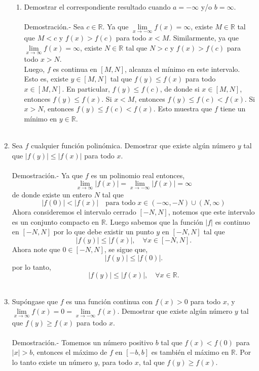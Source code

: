 \begin{enumerate}[\bfseries 1.]
\begin{enumerate}[\bfseries (a)]
	\item Demostrar el correspondiente resultado cuando $a=-\infty$ y/o $b=\infty$.\\\\
	    Demostración.-\; Sea $c\in \mathbb{R}$. Ya que $\lim\limits_{x\to -\infty}f(x) = \infty$, existe $M\in \mathbb{R}$ tal que $M<c$ y $f(x)>f(c)$ para todo $x<M.$ Similarmente, ya que $\lim\limits_{x\to \infty} f(x)=\infty$, existe $N\in \mathbb{R}$ tal que $N>c$ y $f(x)>f(c)$ para todo $x>N$.\\
	    Luego, $f$ es continua en $[M,N]$, alcanza el mínimo en este intervalo. Esto es, existe $y\in [M,N]$ tal que $f(y)\leq f(x)$ para todo $x\in [M,N]$. En particular, $f(y)\leq f(c)$, de donde si $x\in [M,N]$, entonces $f(y)\leq f(x).$ Si $x<M$, entonces $f(y)\leq f(c)<f(x).$ Si $x>N$, entonces $f(y)\leq f(c)<f(x).$ Esto muestra que $f$ tiene un mínimo en $y \in \mathbb{R}.$\\\\

    \end{enumerate}

\item Sea $f$ cualquier función polinómica. Demostrar que existe algún número $y$ tal que $|f(y)|\leq |f(x)|$ para todo $x$.\\\\
    Demostración.-\; Ya que $f$ es un polinomio real entonces,
    $$\lim_{x\to \infty} |f(x)|=\lim_{x\to -\infty}|f(x)|=\infty$$
    de donde existe un entero $N$ tal que 
    $$|f(0)|<|f(x)|\quad \mbox{para todo}\; x\in (-\infty,-N)\cup(N,\infty)$$
    Ahora consideremos el intervalo cerrado $[-N,N]$, notemos que este intervalo es un conjunto compacto en $\mathbb{R}$. Luego sabemos que la función $|f|$ es continuo en $[-N,N]$ por lo que debe existir un punto $y$ en $[-N,N]$ tal que 
    $$|f(y)|\leq |f(x)|,\quad \forall x\in [-N,N].$$
    Ahora note que $0 \in [-N,N]$, se sigue que,
    $$|f(y)|\leq |f(0)|.$$
    por lo tanto,
    $$|f(y)|\leq |f(x)|,\quad \forall x\in \mathbb{R}.$$\\

\item Supóngase que $f$ es una función continua con $f(x)>0$ para todo $x$, y $\lim\limits_{x\to \infty} f(x)=0 = \lim\limits_{x\to -\infty} f(x)$. Demostrar que existe algún número $y$ tal que $f(y)\geq f(x)$ para todo $x$.\\\\
    Demostración.-\; Tomemos un número positivo $b$ tal que $f(x)<f(0)$ para $|x|>b$, entonces el máximo de $f$ en $[-b,b]$ es también el máximo en $\mathbb{R}.$ Por lo tanto existe un número $y$, para todo $x$, tal que $f(y)\geq f(x).$\\\\


\end{enumerate}
